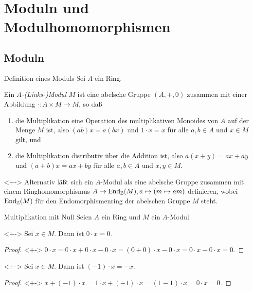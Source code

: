 \section{Moduln und Modulhomomorphismen}

\subsection{Moduln}

\begin{frame}{Definition eines Moduls}
	Sei \(A\) ein Ring.
	\begin{definition}
		Ein \emph{\(A\)-(Links-)Modul \(M\)} ist eine abelsche Gruppe \((A, +, 0)\) 
		zusammen mit einer Abbildung \(\cdot\colon A \times M \to M\), so daß
		\begin{enumerate}[<+->]
		\item
			die Multiplikation eine Operation des multiplikativen Monoides von
			\(A\) auf der Menge \(M\) ist, also \((ab) x = a (b x)\) und
			\(1 \cdot x = x\) für alle \(a, b \in A\) und \(x \in M\) gilt, und
		\item
			die Multiplikation distributiv über die Addition ist, also
			\(a (x + y) = a x + a y\) und \((a + b) x = a x + b y\) für alle
			\(a, b \in A\) und \(x, y \in M\).
		\end{enumerate}
	\end{definition}
	\begin{remark}<+->
		Alternativ läßt sich ein \(A\)-Modul als eine abelsche Gruppe zusammen mit
		einem Ringhomomorphismus \(A \to \operatorname{End}_{\mathbb Z}(M), a \mapsto (m \mapsto a m)\)
		definieren, wobei \(\operatorname{End}_{\mathbb Z}(M)\) für den Endomorphismenring der
		abelschen Gruppe \(M\) steht.
	\end{remark}
\end{frame}

\begin{frame}{Multiplikation mit Null}
	Seien \(A\) ein Ring und \(M\) ein \(A\)-Modul.
    \begin{proposition}<+->
        Sei \(x \in M\). Dann ist \(0 \cdot x = 0\).
    \end{proposition}
    \begin{proof}<+->
        \(0 \cdot x = 0 \cdot x + 0 \cdot x - 0 \cdot x
        = (0 + 0) \cdot x - 0 \cdot x = 0 \cdot x - 0 \cdot x = 0.\)
    \end{proof}
    \begin{corollary}<+->
        Sei \(x \in M\). Dann ist \((-1) \cdot x = -x\).
    \end{corollary}
    \begin{proof}<+->
        \(x + (-1) \cdot x = 1 \cdot x + (-1) \cdot x
        = (1 - 1) \cdot x = 0 \cdot x = 0\).
    \end{proof}
\end{frame}

